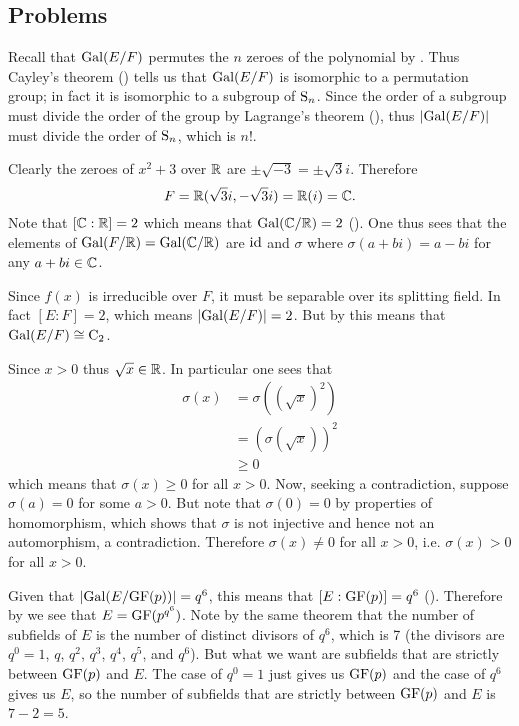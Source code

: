 \subsection*{Problems}
\begin{questions}
    \item Recall that $\mathrm{Gal}(E/F)$ permutes the $n$ zeroes of the polynomial by . Thus Cayley's theorem () tells us that $\mathrm{Gal}(E/F)$ is isomorphic to a permutation group; in fact it is isomorphic to a subgroup of $\mathrm{S}_{n}$. Since the order of a subgroup must divide the order of the group by Lagrange's theorem (), thus $|\mathrm{Gal}(E/F)|$ must divide the order of $\mathrm{S}_{n}$, which is $n!$.

    \item Clearly the zeroes of $x^2 + 3$ over $\mathbb{R}$ are $\pm\sqrt{-3} = \pm\sqrt3i$. Therefore
    \[
        F = \mathbb{R}(\sqrt3i, -\sqrt3i) = \mathbb{R}(i) = \mathbb{C}.
    \]
    Note that $[\mathbb{C}:\mathbb{R}] = 2$ which means that $\mathrm{Gal}(\mathbb{C}/\mathbb{R}) = 2$ (). One thus sees that the elements of $\mathrm{Gal}(F/\mathbb{R}) = \mathrm{Gal}(\mathbb{C}/\mathbb{R})$ are $\mathrm{id}$ and $\sigma$ where $\sigma(a + bi) = a - bi$ for any $a + bi \in \mathbb{C}$.

    \item Since $f(x)$ is irreducible over $F$, it must be separable over its splitting field. In fact $[E:F] = 2$, which means $|\mathrm{Gal}(E/F)| = 2$. But by  this means that $\mathrm{Gal}(E/F) \cong \mathrm{C}_{2}$.

    \item Since $x > 0$ thus $\sqrt x \in \mathbb{R}$. In particular one sees that
    \begin{align*}
        \sigma(x) &= \sigma\left((\sqrt x)^2\right)\\
        &= \left(\sigma(\sqrt x)\right)^2\\
        &\geq 0
    \end{align*}
    which means that $\sigma(x) \geq 0$ for all $x > 0$. Now, seeking a contradiction, suppose $\sigma(a) = 0$ for some $a > 0$. But note that $\sigma(0) = 0$ by properties of homomorphism, which shows that $\sigma$ is not injective and hence not an automorphism, a contradiction. Therefore $\sigma(x) \neq 0$ for all $x > 0$, i.e. $\sigma(x) > 0$ for all $x > 0$.

    \item Given that $|\mathrm{Gal}(E/\mathrm{GF}(p))| = q^6$, this means that $[E:\mathrm{GF}(p)] = q^6$ (). Therefore by  we see that $E = \mathrm{GF}(p^{q^6})$. Note by the same theorem that the number of subfields of $E$ is the number of distinct divisors of $q^6$, which is 7 (the divisors are $q^0 = 1$, $q$, $q^2$, $q^3$, $q^4$, $q^5$, and $q^6$). But what we want are subfields that are strictly between $\mathrm{GF}(p)$ and $E$. The case of $q^0 = 1$ just gives us $\mathrm{GF}(p)$ and the case of $q^6$ gives us $E$, so the number of subfields that are strictly between $\mathrm{GF}(p)$ and $E$ is $7 - 2 = 5$.


\end{questions}
